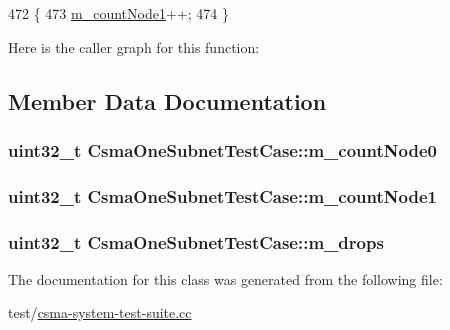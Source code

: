 \begin{DoxyCode}
472 \{
473   \hyperlink{classCsmaOneSubnetTestCase_a20d7930437e90b31c63ddd44dddadea9}{m\_countNode1}++;
474 \}
\end{DoxyCode}


Here is the caller graph for this function\+:




\subsection{Member Data Documentation}
\subsubsection[{\texorpdfstring{m\+\_\+count\+Node0}{m_countNode0}}]{\setlength{\rightskip}{0pt plus 5cm}uint32\+\_\+t Csma\+One\+Subnet\+Test\+Case\+::m\+\_\+count\+Node0\hspace{0.3cm}{\ttfamily [private]}}\hypertarget{classCsmaOneSubnetTestCase_a6c95d4e0da52a5487399a05a7fcb6f05}{}\label{classCsmaOneSubnetTestCase_a6c95d4e0da52a5487399a05a7fcb6f05}
\subsubsection[{\texorpdfstring{m\+\_\+count\+Node1}{m_countNode1}}]{\setlength{\rightskip}{0pt plus 5cm}uint32\+\_\+t Csma\+One\+Subnet\+Test\+Case\+::m\+\_\+count\+Node1\hspace{0.3cm}{\ttfamily [private]}}\hypertarget{classCsmaOneSubnetTestCase_a20d7930437e90b31c63ddd44dddadea9}{}\label{classCsmaOneSubnetTestCase_a20d7930437e90b31c63ddd44dddadea9}
\subsubsection[{\texorpdfstring{m\+\_\+drops}{m_drops}}]{\setlength{\rightskip}{0pt plus 5cm}uint32\+\_\+t Csma\+One\+Subnet\+Test\+Case\+::m\+\_\+drops\hspace{0.3cm}{\ttfamily [private]}}\hypertarget{classCsmaOneSubnetTestCase_ac1eaf8ce1456f65f5df9ecea4b99ec1c}{}\label{classCsmaOneSubnetTestCase_ac1eaf8ce1456f65f5df9ecea4b99ec1c}


The documentation for this class was generated from the following file\+:\begin{DoxyCompactItemize}
\item 
test/\hyperlink{csma-system-test-suite_8cc}{csma-\/system-\/test-\/suite.\+cc}\end{DoxyCompactItemize}
